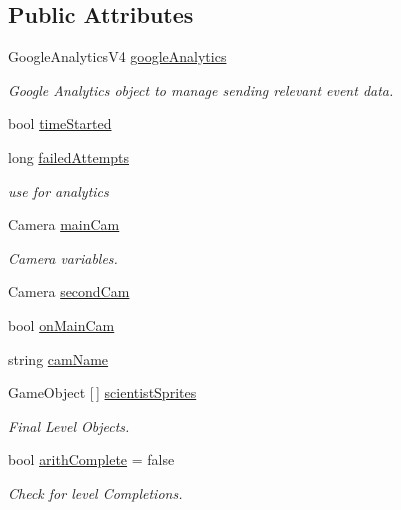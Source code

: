 \subsection*{Public Attributes}
\begin{DoxyCompactItemize}
\item 
Google\+Analytics\+V4 \hyperlink{class_global_controller_a07eab03323734ee3d6bb98fbcd74631d}{google\+Analytics}
\begin{DoxyCompactList}\small\item\em Google Analytics object to manage sending relevant event data. \end{DoxyCompactList}\item 
bool \hyperlink{class_global_controller_a2ba8216c6a7ce8c86fac9109f862f987}{time\+Started}
\item 
long \hyperlink{class_global_controller_a62c9cd6f677068c5ee01ee2d111dc1e0}{failed\+Attempts}
\begin{DoxyCompactList}\small\item\em use for analytics \end{DoxyCompactList}\item 
Camera \hyperlink{class_global_controller_a5306f034de74eb967dcb2ac69f65dc1b}{main\+Cam}
\begin{DoxyCompactList}\small\item\em Camera variables. \end{DoxyCompactList}\item 
Camera \hyperlink{class_global_controller_a5a49301b40b343a34455602a61352f38}{second\+Cam}
\item 
bool \hyperlink{class_global_controller_a38a9c134634e25115dbaabe0599402c5}{on\+Main\+Cam}
\item 
string \hyperlink{class_global_controller_a9d3bd43867859b70cddd42139c588884}{cam\+Name}
\item 
Game\+Object \mbox{[}$\,$\mbox{]} \hyperlink{class_global_controller_a562bed7b82ef0ae6b84ef6bbc061fcd2}{scientist\+Sprites}
\begin{DoxyCompactList}\small\item\em Final Level Objects. \end{DoxyCompactList}\item 
bool \hyperlink{class_global_controller_adb1a210e3781f70338fb7e41bbf27bf5}{arith\+Complete} = false
\begin{DoxyCompactList}\small\item\em Check for level Completions. \end{DoxyCompactList}\item 

\end{DoxyCompactItemize}
